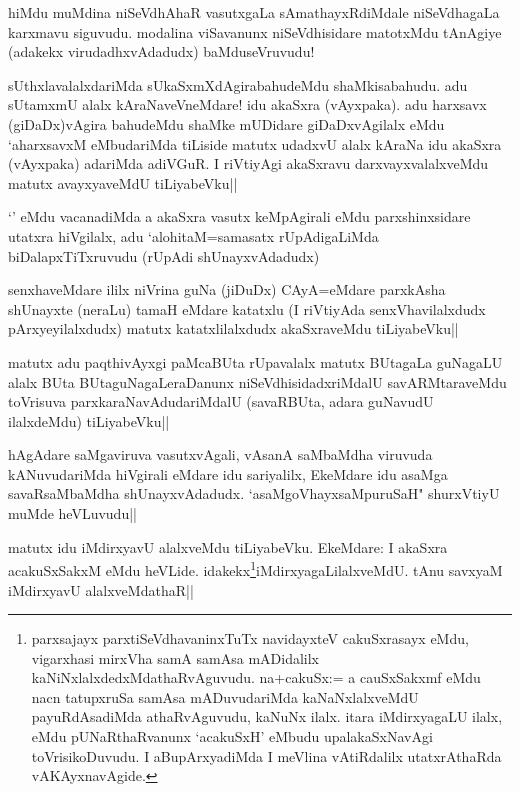 
\begin{artha}
hiMdu muMdina niSeVdhAhaR vasutxgaLa sAmathayxRdiMdale niSeVdhagaLa karxmavu siguvudu. modalina viSavanunx niSeVdhisidare matotxMdu tAnAgiye (adakekx virudadhxvAdadudx) baMduseVruvudu!
\end{artha}%


\begin{artha}
sUthxlavalalxdariMda sUkaSxmXdAgirabahudeMdu shaMkisabahudu. adu sUtamxmU alalx kAraNaveVneMdare! idu akaSxra (vAyxpaka). adu harxsavx (giDaDx)vAgira bahudeMdu shaMke mUDidare giDaDxvAgilalx eMdu `aharxsavxM eMbudariMda tiLiside matutx udadxvU alalx kAraNa idu akaSxra (vAyxpaka) adariMda adiVGuR. I riVtiyAgi akaSxravu darxvayxvalalxveMdu matutx avayxyaveMdU tiLiyabeVku||
\end{artha}

\begin{artha}
`\stext ' eMdu vacanadiMda a akaSxra vasutx keMpAgirali eMdu parxshinxsidare utatxra hiVgilalx, adu `alohitaM=samasatx rUpAdigaLiMda biDalapxTiTxruvudu (rUpAdi shUnayxvAdadudx)
\end{artha}


\begin{artha}
senxhaveMdare ililx niVrina guNa (jiDuDx) CAyA=eMdare parxkAsha shUnayxte (neraLu) tamaH eMdare katatxlu (I riVtiyAda senxVhavilalxdudx pArxyeyilalxdudx) matutx katatxlilalxdudx akaSxraveMdu tiLiyabeVku||
\end{artha}

\begin{artha}%
matutx adu paqthivAyxgi paMcaBUta rUpavalalx matutx BUtagaLa guNagaLU alalx BUta BUtaguNagaLeraDanunx niSeVdhisidadxriMdalU savARMtaraveMdu toVrisuva parxkaraNavAdudariMdalU (savaRBUta, adara guNavudU ilalxdeMdu) tiLiyabeVku||
\end{artha}

\begin{artha}
hAgAdare saMgaviruva vasutxvAgali, vAsanA saMbaMdha viruvuda kANuvudariMda hiVgirali eMdare idu sariyalilx, EkeMdare idu asaMga savaRsaMbaMdha shUnayxvAdadudx. `asaMgoVhayxsaMpuruSaH" shurxVtiyU muMde heVLuvudu||
\end{artha}

\begin{artha}
matutx idu iMdirxyavU alalxveMdu tiLiyabeVku. EkeMdare: I akaSxra acakuSxSakxM eMdu heVLide. idakekx\footnote[1]{parxsajayx parxtiSeVdhavaninxTuTx navidayxteV cakuSxrasayx eMdu, vigarxhasi mirxVha samA samAsa mADidalilx kaNiNxlalxdedxMdathaRvAguvudu. na+cakuSx:= a cauSxSakxmf eMdu nacn tatupxruSa samAsa mADuvudariMda kaNaNxlalxveMdU payuRdAsadiMda athaRvAguvudu, kaNuNx ilalx. itara iMdirxyagaLU ilalx, eMdu pUNaRthaRvanunx `acakuSxH' eMbudu upalakaSxNavAgi toVrisikoDuvudu. I aBupArxyadiMda I meVlina vAtiRdalilx utatxrAthaRda vAKAyxnavAgide.}iMdirxyagaLilalxveMdU. tAnu savxyaM iMdirxyavU alalxveMdathaR||
\end{artha}

